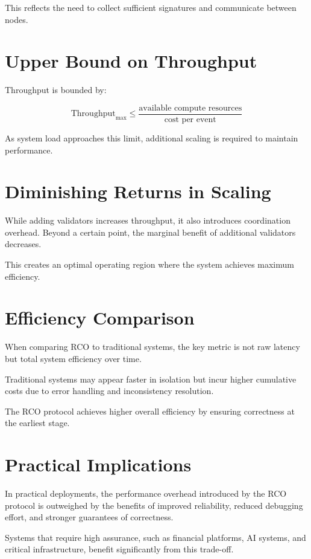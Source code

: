 This reflects the need to collect sufficient signatures and communicate between nodes.

\section{Upper Bound on Throughput}

Throughput is bounded by:

\begin{equation}
\text{Throughput}_{\text{max}} \leq \frac{\text{available compute resources}}{\text{cost per event}}
\end{equation}

As system load approaches this limit, additional scaling is required to maintain performance.

\section{Diminishing Returns in Scaling}

While adding validators increases throughput, it also introduces coordination overhead. Beyond a certain point, the marginal benefit of additional validators decreases.

This creates an optimal operating region where the system achieves maximum efficiency.

\section{Efficiency Comparison}

When comparing RCO to traditional systems, the key metric is not raw latency but total system efficiency over time.

Traditional systems may appear faster in isolation but incur higher cumulative costs due to error handling and inconsistency resolution.

The RCO protocol achieves higher overall efficiency by ensuring correctness at the earliest stage.

\section{Practical Implications}

In practical deployments, the performance overhead introduced by the RCO protocol is outweighed by the benefits of improved reliability, reduced debugging effort, and stronger guarantees of correctness.

Systems that require high assurance, such as financial platforms, AI systems, and critical infrastructure, benefit significantly from this trade-off.

